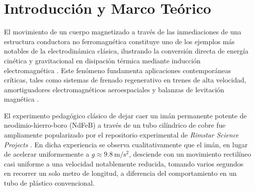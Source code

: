 \documentclass[aps,prb,reprint,twocolumn,superscriptaddress,amsmath,amssymb,floatfix]{revtex4-2}
\begin{document}
\begin{abstract}
\vspace{0.8em}
\textbf{Abstract}---This work presents a rigorous theoretical and computational investigation of eddy current magnetic braking for a cylindrical neodymium magnet falling through conductive pipes, inspired by the classic experiment from Rimstar Science Projects. A numerical model based on Maxwell-Faraday and Lenz laws was implemented, solving the equations of motion via an adaptive fourth-fifth order Runge-Kutta algorithm. Three $1.00\ \mathrm{m}$ tubes were evaluated: electrolytic copper ($\sigma = 5.96 \times 10^7\ \mathrm{S/m}$), 6061-T6 aluminum ($\sigma = 3.77 \times 10^7\ \mathrm{S/m}$), and insulating PVC as a free-fall control. In copper, the $28.5\ \mathrm{g}$ magnet reached a steady terminal velocity of $(0.0915 \pm 0.0076)\ \mathrm{m/s}$ after $9.3\ \mathrm{ms}$, yielding a total transit time of $(10.97 \pm 0.94)\ \mathrm{s}$ compared to $0.463\ \mathrm{s}$ in PVC. Scaling laws establishing that damping scales as $R^{-4}$ and terminal velocity scales inversely with conductivity ($v_t \propto \sigma^{-1}$) were verified. Energy analysis demonstrated that gravitational potential energy was entirely dissipated through Joule heating ($282.2\ \mathrm{mJ}$). Analytical uncertainty propagation showed complete agreement with Monte Carlo distributions ($N=1000$).
\end{abstract}

\maketitle

\section{Introducción y Marco Teórico}
El movimiento de un cuerpo magnetizado a través de las inmediaciones de una estructura conductora no ferromagnética constituye uno de los ejemplos más notables de la electrodinámica clásica, ilustrando la conversión directa de energía cinética y gravitacional en disipación térmica mediante inducción electromagnética \cite{Griffiths2017,Jackson1999}. Este fenómeno fundamenta aplicaciones contemporáneas críticas, tales como sistemas de frenado regenerativo en trenes de alta velocidad, amortiguadores electromagnéticos aeroespaciales y balanzas de levitación magnética \cite{Saslow1992}.

El experimento pedagógico clásico de dejar caer un imán permanente potente de neodimio-hierro-boro (NdFeB) a través de un tubo cilíndrico de cobre fue ampliamente popularizado por el repositorio experimental de \textit{Rimstar Science Projects} \cite{Rimstar2013}. En dicha experiencia se observa cualitativamente que el imán, en lugar de acelerar uniformemente a $g \approx 9.8\ \mathrm{m/s^2}$, desciende con un movimiento rectilíneo casi uniforme a una velocidad notablemente reducida, tomando varios segundos en recorrer un solo metro de longitud, a diferencia del comportamiento en un tubo de plástico convencional.
\end{document}
